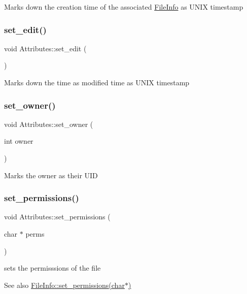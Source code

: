 Marks down the creation time of the associated \mbox{\hyperlink{classFileInfo}{File\+Info}} as U\+N\+IX timestamp \mbox{\label{classAttributes_a88674bf65fba99d32870c7fa48edf135}} 
\subsubsection{\texorpdfstring{set\+\_\+edit()}{set\_edit()}}
{\footnotesize\ttfamily void Attributes\+::set\+\_\+edit (\begin{DoxyParamCaption}{ }\end{DoxyParamCaption})}

Marks down the time as modified time as U\+N\+IX timestamp \mbox{\label{classAttributes_affdf3abb52a45ac3c9051bafd0da9e7e}} 
\subsubsection{\texorpdfstring{set\+\_\+owner()}{set\_owner()}}
{\footnotesize\ttfamily void Attributes\+::set\+\_\+owner (\begin{DoxyParamCaption}\item[{int}]{owner }\end{DoxyParamCaption})}

Marks the owner as their U\+ID \mbox{\label{classAttributes_aac8ca00f98b22280df69f62e42b72b8b}} 
\subsubsection{\texorpdfstring{set\+\_\+permissions()}{set\_permissions()}}
{\footnotesize\ttfamily void Attributes\+::set\+\_\+permissions (\begin{DoxyParamCaption}\item[{char $\ast$}]{perms }\end{DoxyParamCaption})}

sets the permisssions of the file \begin{DoxySeeAlso}{See also}
\mbox{\hyperlink{classFileInfo_a377208012195dba0b24723837f6db39f}{File\+Info\+::set\+\_\+permissions(char$\ast$)}} 
\end{DoxySeeAlso}
\mbox{\label{classAttributes_a3983ec45af66e9b19367222092b7df6c}} 
